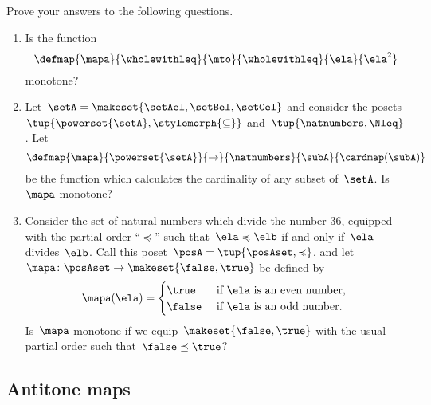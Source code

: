 \clearpage
\vfill
\begin{gradedexercise}
    \label{ex:MonotoneMapCheck}

    Prove your answers to the following questions.
    \begin{enumerate}
        \item Is the function
              \begin{equation*}
                  \defmap{\mapa}{\wholewithleq}{\mto}{\wholewithleq}{\ela}{\ela^2}
              \end{equation*}
              monotone?
        \item Let~$\setA = \makeset{\setAel, \setBel, \setCel}$ and consider the posets~$\tup{\powerset{\setA}, \stylemorph{\subseteq}}$ and~$\tup{\natnumbers, \Nleq}$.
              Let
              \begin{equation*}
                  \defmap{\mapa}{\powerset{\setA}}{\to}{\natnumbers}{\subA}{\cardmap(\subA)}
              \end{equation*}
              be the function which calculates the cardinality of any subset of~$\setA$.
              Is~$\mapa$ monotone?
        \item Consider the set of natural numbers which divide the number 36, equipped with the partial order ``$\preccurlyeq$'' such that~$\ela \preccurlyeq \elb$ if and only if~$\ela$ divides~$\elb$.
              Call this poset~$\posA = \tup{\posAset, \preccurlyeq}$, and let~$\mapa \colon \posAset \to \makeset{\false, \true}$ be defined by
              \begin{equation}
                  \mapa(\ela) =
                  \begin{cases}
                      \true  & \text{ if } \ela \text{ is an even number, } \\
                      \false & \text{ if } \ela \text{ is an odd number.
                      }
                  \end{cases}
              \end{equation}
              Is~$\mapa$ monotone if we equip~$\makeset{\false, \true}$ with the usual partial order such that~$\false \preceq \true$?
    \end{enumerate}
\end{gradedexercise}

\subsection{Antitone maps}

